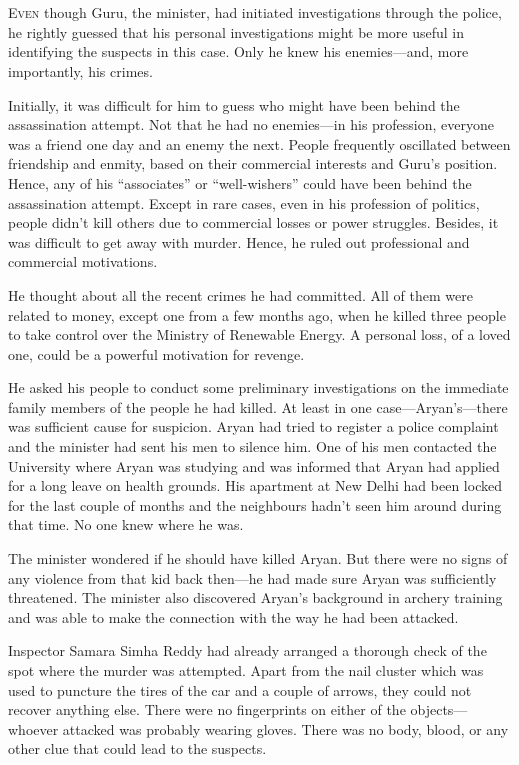 \chapter{}

\lettrine{E}{ven} though Guru, the minister, had initiated investigations through the
police, he rightly guessed that his personal investigations might be more useful
in identifying the suspects in this case. Only he knew his enemies—and, more
importantly, his crimes.

Initially, it was difficult for him to guess who might have been behind the
assassination attempt. Not that he had no enemies—in his profession, everyone
was a friend one day and an enemy the next. People frequently oscillated
between friendship and enmity, based on their commercial interests and Guru's
position. Hence, any of his “associates” or “well-wishers” could have been behind
the assassination attempt. Except in rare cases, even in his profession
of politics, people didn't kill others due to commercial losses or power struggles. Besides, it was difficult to get away with murder. Hence, he
ruled out professional and commercial motivations.

He thought about all the recent crimes he had committed. All of them were
related to money, except one from a few months ago, when he killed three people to
take control over the Ministry of Renewable Energy. A personal loss, of
a loved one, could be a powerful motivation for revenge.

He asked his people to conduct some preliminary investigations on the immediate
family members of the people he had killed. At least in one
case—Aryan's—there was sufficient cause for suspicion. Aryan had tried to register
a police
complaint and the minister had sent his men to silence him. One of his men
contacted the University where Aryan was studying and was informed that Aryan
had applied for a long leave on health grounds. His apartment at New Delhi had
been locked for the last couple of months and the neighbours hadn't seen him
around during that time. No one knew where he was.

The minister wondered if he should have killed Aryan. But there were no signs of
any violence from that kid back then—he had made sure Aryan was sufficiently
threatened. The minister also discovered Aryan's background in archery training
and was able to make the connection with the way he had been attacked.

Inspector Samara Simha Reddy had already arranged a thorough check of the
spot where the murder was attempted. Apart from the nail cluster which was used to
puncture the tires of the car and a couple of arrows, they could not recover
anything else. There were no fingerprints on either of the objects—whoever
attacked was probably wearing gloves. There was no body, blood, or any other clue
that could lead to the suspects.


